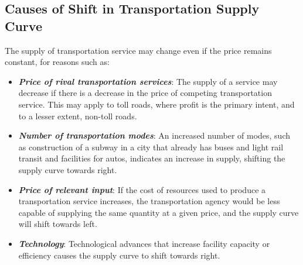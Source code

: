\subsection{Causes of Shift in Transportation Supply Curve}
The supply of transportation service may change even if the price remains constant, for reasons such as:
\begin{itemize}
	\item \textit{\textbf{Price of rival transportation services}}: The supply of a service may decrease if there is a decrease in the price of competing transportation service. This may apply to toll roads, where profit is the primary intent, and to a lesser extent, non-toll roads.
	\item \textit{\textbf{Number of transportation modes}}: An increased number of modes, such as construction of a subway in a city that already has buses and light rail transit and facilities for autos, indicates an increase in supply, shifting the supply curve towards right.
	\item \textit{\textbf{Price of relevant input}}: If the cost of resources used to produce a transportation service increases, the transportation agency would be less capable of supplying the same quantity at a given price, and the supply curve will shift towards left.
	\item \textit{\textbf{Technology}}: Technological advances that increase facility capacity or efficiency causes the supply curve to shift towards right.
\end{itemize}
%

